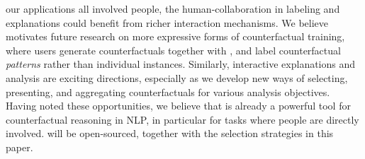  our applications all involved people, the human-\sysname collaboration in labeling and explanations could benefit from richer interaction mechanisms. 
We believe \sysname motivates future research on more expressive forms of counterfactual training, where users generate counterfactuals together with \sysname, and label counterfactual \emph{patterns} rather than individual instances. 
Similarly, interactive explanations and analysis are exciting directions, especially as we develop new ways of selecting, presenting, and aggregating counterfactuals for various analysis objectives.
Having noted these opportunities, we believe that \sysname is already a powerful tool for counterfactual reasoning in NLP, in particular for tasks where people are directly involved. 
\sysname will be open-sourced, together with the selection strategies in this paper.




